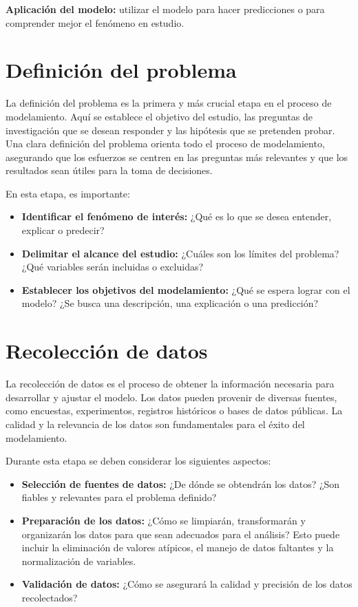 \documentclass[
  letterpaper,
  DIV=11,
  numbers=noendperiod]{scrreprt}
\providecommand{\tightlist}{%
  \setlength{\itemsep}{0pt}\setlength{\parskip}{0pt}}\usepackage{longtable,booktabs,array}
\begin{document}
\textbf{Aplicación del modelo:} utilizar el modelo para hacer
predicciones o para comprender mejor el fenómeno en estudio.

\section{Definición del problema}\label{definiciuxf3n-del-problema}

La definición del problema es la primera y más crucial etapa en el
proceso de modelamiento. Aquí se establece el objetivo del estudio, las
preguntas de investigación que se desean responder y las hipótesis que
se pretenden probar. Una clara definición del problema orienta todo el
proceso de modelamiento, asegurando que los esfuerzos se centren en las
preguntas más relevantes y que los resultados sean útiles para la toma
de decisiones.

En esta etapa, es importante:

\begin{itemize}
\tightlist
\item
  \textbf{Identificar el fenómeno de interés:} ¿Qué es lo que se desea
  entender, explicar o predecir?
\item
  \textbf{Delimitar el alcance del estudio:} ¿Cuáles son los límites del
  problema? ¿Qué variables serán incluidas o excluidas?
\item
  \textbf{Establecer los objetivos del modelamiento:} ¿Qué se espera
  lograr con el modelo? ¿Se busca una descripción, una explicación o una
  predicción?
\end{itemize}

\section{Recolección de datos}\label{recolecciuxf3n-de-datos}

La recolección de datos es el proceso de obtener la información
necesaria para desarrollar y ajustar el modelo. Los datos pueden
provenir de diversas fuentes, como encuestas, experimentos, registros
históricos o bases de datos públicas. La calidad y la relevancia de los
datos son fundamentales para el éxito del modelamiento.

Durante esta etapa se deben considerar los siguientes aspectos:

\begin{itemize}
\tightlist
\item
  \textbf{Selección de fuentes de datos:} ¿De dónde se obtendrán los
  datos? ¿Son fiables y relevantes para el problema definido?
\item
  \textbf{Preparación de los datos:} ¿Cómo se limpiarán, transformarán y
  organizarán los datos para que sean adecuados para el análisis? Esto
  puede incluir la eliminación de valores atípicos, el manejo de datos
  faltantes y la normalización de variables.
\item
  \textbf{Validación de datos:} ¿Cómo se asegurará la calidad y
  precisión de los datos recolectados?
\end{itemize}
\end{document}
